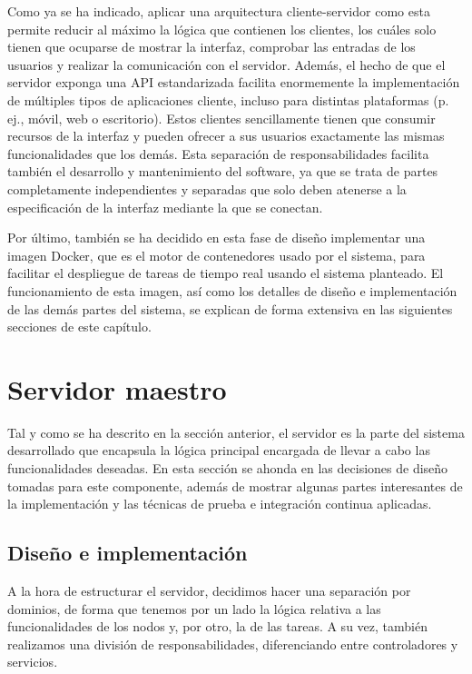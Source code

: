 Como ya se ha indicado, aplicar una arquitectura cliente-servidor como esta
permite reducir al máximo la lógica que contienen los clientes, los cuáles solo
tienen que ocuparse de mostrar la interfaz, comprobar las entradas de los
usuarios y realizar la comunicación con el servidor. Además, el hecho de que el
servidor exponga una API estandarizada facilita enormemente la implementación de
múltiples tipos de aplicaciones cliente, incluso para distintas plataformas (p.
ej., móvil, web o escritorio). Estos clientes sencillamente tienen que consumir
recursos de la interfaz y pueden ofrecer a sus usuarios exactamente las mismas
funcionalidades que los demás. Esta separación de responsabilidades facilita
también el desarrollo y mantenimiento del software, ya que se trata de partes
completamente independientes y separadas que solo deben atenerse a la
especificación de la interfaz mediante la que se conectan.

Por último, también se ha decidido en esta fase de diseño implementar una imagen
Docker, que es el motor de contenedores usado por el sistema, para facilitar el
despliegue de tareas de tiempo real usando el sistema planteado. El
funcionamiento de esta imagen, así como los detalles de diseño e implementación
de las demás partes del sistema, se explican de forma extensiva en las
siguientes secciones de este capítulo.

\section{Servidor maestro}

Tal y como se ha descrito en la sección anterior, el servidor es la parte del
sistema desarrollado que encapsula la lógica principal encargada de llevar a
cabo las funcionalidades deseadas. En esta sección se ahonda en las decisiones
de diseño tomadas para este componente, además de mostrar algunas partes
interesantes de la implementación y las técnicas de prueba e integración
continua aplicadas.

\subsection{Diseño e implementación}
\label{sec:server-design}

A la hora de estructurar el servidor, decidimos hacer una separación por
dominios, de forma que tenemos por un lado la lógica relativa a las
funcionalidades de los nodos y, por otro, la de las tareas. A su vez, también
realizamos una división de responsabilidades, diferenciando entre controladores
y servicios.

